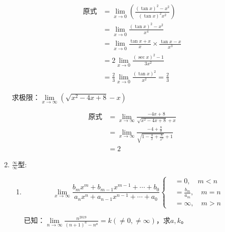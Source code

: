 \begin{enumerate}
            \begin{solution}
                \begin{align*}
                    \text{原式}
                    &=\lim_{x \to 0}(\frac{(\tan x)^2-x^2}{(\tan x)^2 x^2})\\
                    &=\lim_{x \to 0}\frac{(\tan x)^2 -x^2}{x^4}\\
                    &=\lim_{x \to 0}\frac{\tan x +x}{x} \times \frac{\tan x -x}{x^3}\\
                    &=2\lim_{x \to 0}\frac{(\sec x)^2 -1}{3x^2}\\
                    &=\frac{2}{3}\lim_{x \to 0}\frac{(\tan x)^2}{x^2}=\frac{2}{3}
                \end{align*}
            \end{solution}

            \begin{example}
                求极限：$\lim\limits_{x \to \infty}(\sqrt{x^2-4x+8}-x)$
            \end{example}

            \begin{solution}
                \begin{align*}
                    \text{原式}
                    &=\lim_{x \to \infty}\frac{-4x+8}{\sqrt{x^2-4x+8}+x}\\
                    &=\lim_{x \to \infty}\frac{-4+\frac{8}{x}}{\sqrt{1-\frac{4}{x}+\frac{8}{x^2}}+1}\\
                    &=2
                \end{align*}
            \end{solution}

            \item $ \displaystyle\frac{\infty}{\infty} $型:
            \begin{enumerate}
                \item                     
                \[ \lim_{x \to \infty} \frac{b_m x^m+b_{m-1}x^{m-1}+\cdots+b_0}{a_n x^n+a_{n-1}x^{n-1}+\cdots+a_0}
                \left\{
                    \begin{array}{rl}
                        &= 0, \quad m<n\\
                        &= \frac{b_m}{a_m},\quad m=n\\
                        &= \infty,\quad m>n
                    \end{array} \right. \]
           

        \begin{example}
            已知：$\lim\limits_{n \to \infty}\displaystyle\frac{n^{2019}}{(n+1)^a-n^a}=k(\neq 0,\neq \infty)$，求$a,k$。
        \end{example}
        

\end{enumerate}
\end{enumerate}
